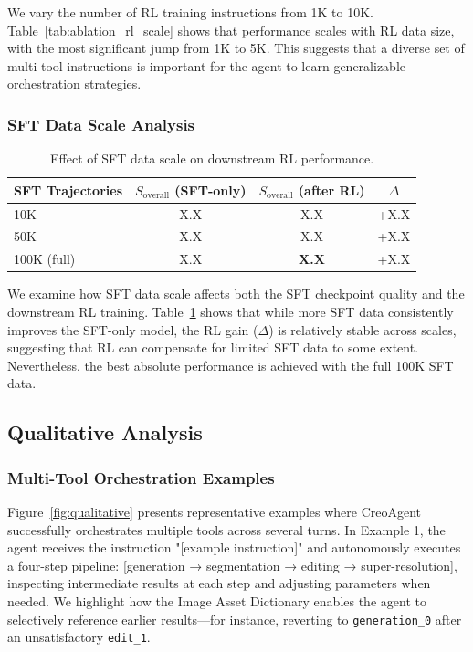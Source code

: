 \documentclass{article}
\begin{document}
We vary the number of RL training instructions from 1K to 10K. Table~\ref{tab:ablation_rl_scale} shows that performance scales with RL data size, with the most significant jump from 1K to 5K. This suggests that a diverse set of multi-tool instructions is important for the agent to learn generalizable orchestration strategies.

\subsubsection{SFT Data Scale Analysis}

\begin{table}[t]
\centering
\caption{Effect of SFT data scale on downstream RL performance.}
\label{tab:ablation_sft_scale}
\begin{tabular}{lccc}
\toprule
\textbf{SFT Trajectories} & $S_{\text{overall}}$ (SFT-only) & $S_{\text{overall}}$ (after RL) & $\Delta$ \\
\midrule
10K & X.X & X.X & +X.X \\
50K & X.X & X.X & +X.X \\
100K (full) & X.X & \textbf{X.X} & +X.X \\
\bottomrule
\end{tabular}
\end{table}



We examine how SFT data scale affects both the SFT checkpoint quality and the downstream RL training. Table~\ref{tab:ablation_sft_scale} shows that while more SFT data consistently improves the SFT-only model, the RL gain ($\Delta$) is relatively stable across scales, suggesting that RL can compensate for limited SFT data to some extent. Nevertheless, the best absolute performance is achieved with the full 100K SFT data.

\subsection{Qualitative Analysis}

\subsubsection{Multi-Tool Orchestration Examples}

Figure~\ref{fig:qualitative} presents representative examples where CreoAgent successfully orchestrates multiple tools across several turns. In Example 1, the agent receives the instruction "[example instruction]" and autonomously executes a four-step pipeline: [generation → segmentation → editing → super-resolution], inspecting intermediate results at each step and adjusting parameters when needed. We highlight how the Image Asset Dictionary enables the agent to selectively reference earlier results—for instance, reverting to \texttt{generation\_0} after an unsatisfactory \texttt{edit\_1}.
\end{document}
